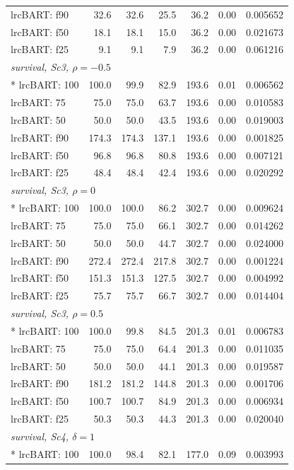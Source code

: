 \begin{longtable}{lrrrrrr}
lrcBART: f90 & 32.6 & 32.6 & 25.5 & 36.2 & 0.00 & 0.005652 \\
lrcBART: f50 & 18.1 & 18.1 & 15.0 & 36.2 & 0.00 & 0.021673 \\
lrcBART: f25 & 9.1 & 9.1 & 7.9 & 36.2 & 0.00 & 0.061216 \\
\multicolumn{7}{l}{\strut\textit{survival, Sc3, $\rho=-0.5$}}\\*
lrcBART: 100 & 100.0 & 99.9 & 82.9 & 193.6 & 0.01 & 0.006562 \\
lrcBART: 75 & 75.0 & 75.0 & 63.7 & 193.6 & 0.00 & 0.010583 \\
lrcBART: 50 & 50.0 & 50.0 & 43.5 & 193.6 & 0.00 & 0.019003 \\
lrcBART: f90 & 174.3 & 174.3 & 137.1 & 193.6 & 0.00 & 0.001825 \\
lrcBART: f50 & 96.8 & 96.8 & 80.8 & 193.6 & 0.00 & 0.007121 \\
lrcBART: f25 & 48.4 & 48.4 & 42.4 & 193.6 & 0.00 & 0.020292 \\
\multicolumn{7}{l}{\strut\textit{survival, Sc3, $\rho=0$}}\\*
lrcBART: 100 & 100.0 & 100.0 & 86.2 & 302.7 & 0.00 & 0.009624 \\
lrcBART: 75 & 75.0 & 75.0 & 66.1 & 302.7 & 0.00 & 0.014262 \\
lrcBART: 50 & 50.0 & 50.0 & 44.7 & 302.7 & 0.00 & 0.024000 \\
lrcBART: f90 & 272.4 & 272.4 & 217.8 & 302.7 & 0.00 & 0.001224 \\
lrcBART: f50 & 151.3 & 151.3 & 127.5 & 302.7 & 0.00 & 0.004992 \\
lrcBART: f25 & 75.7 & 75.7 & 66.7 & 302.7 & 0.00 & 0.014404 \\
\multicolumn{7}{l}{\strut\textit{survival, Sc3, $\rho=0.5$}}\\*
lrcBART: 100 & 100.0 & 99.8 & 84.5 & 201.3 & 0.01 & 0.006783 \\
lrcBART: 75 & 75.0 & 75.0 & 64.4 & 201.3 & 0.00 & 0.011035 \\
lrcBART: 50 & 50.0 & 50.0 & 44.1 & 201.3 & 0.00 & 0.019587 \\
lrcBART: f90 & 181.2 & 181.2 & 144.8 & 201.3 & 0.00 & 0.001706 \\
lrcBART: f50 & 100.7 & 100.7 & 84.9 & 201.3 & 0.00 & 0.006934 \\
lrcBART: f25 & 50.3 & 50.3 & 44.3 & 201.3 & 0.00 & 0.020040 \\
\multicolumn{7}{l}{\strut\textit{survival, Sc4, $\delta=1$}}\\*
lrcBART: 100 & 100.0 & 98.4 & 82.1 & 177.0 & 0.09 & 0.003993 \\

\end{longtable}
